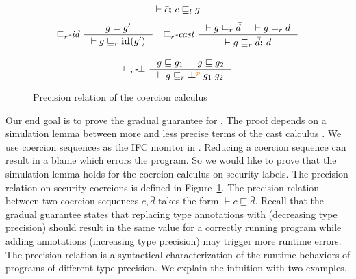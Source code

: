 \begin{figure}[tbp]
{\begin{gather*}
              {\vdash \bar{c} \ensuremath{\boldsymbol{;}\,}c \sqsubseteq_l g}
  \end{gather*}}
 {\small
  \begin{gather*}
    {\sqsubseteq}_r\textit{-id} ~
    \inference{g \sqsubseteq g'}
              {\vdash g \sqsubseteq_r \id{g'}}
    \quad
    {\sqsubseteq}_r\textit{-cast} ~
    \inference{\vdash g \sqsubseteq_r \bar{d} & \vdash g \sqsubseteq_r d}
              {\vdash g \sqsubseteq_r \bar{d} \seq d}
    \\[2ex]
    {\sqsubseteq}_r\textit{-}\bot ~
    \inference{g \sqsubseteq g_1 & g \sqsubseteq g_2}
              {\vdash g \sqsubseteq_r \err{g_1}{g_2}{p}}
  \end{gather*}}
  \caption{Precision relation of the coercion calculus}
  \label{fig:cexpr-prec}
\end{figure}

Our end goal is to prove the gradual guarantee for \Surface.
The proof depends on a simulation lemma between more and less precise terms of
the cast calculus \CC . We use coercion sequences as the IFC monitor in \CC.
Reducing a coercion sequence can result in a blame which errors the program. So
we would like to prove that the simulation lemma holds for the coercion calculus
on security labels.
%
The precision relation on security coercions is defined in
Figure~\ref{fig:cexpr-prec}. The precision relation between two coercion
sequences $\bar{c},\bar{d}$ takes the form $\vdash \bar{c} \sqsubseteq \bar{d}$.
Recall that the gradual guarantee states that replacing type annotations with
\unk (decreasing type precision) should result in the same value for a correctly
running program while adding annotations (increasing type precision) may trigger
more runtime errors. The precision relation is a syntactical characterization of
the runtime behaviors of programs of different type precision. We explain the
intuition with two examples.

